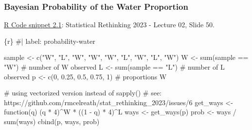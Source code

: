 \documentclass[
  letterpaper,
  DIV=11,
  numbers=noendperiod]{scrreprt}
\newenvironment{Shaded}{\begin{snugshade}}{\end{snugshade}}
\newcommand{\CommentTok}[1]{\textcolor[rgb]{0.37,0.37,0.37}{#1}}
\newcommand{\ControlFlowTok}[1]{\textcolor[rgb]{0.00,0.23,0.31}{#1}}
\newcommand{\DecValTok}[1]{\textcolor[rgb]{0.68,0.00,0.00}{#1}}
\newcommand{\FloatTok}[1]{\textcolor[rgb]{0.68,0.00,0.00}{#1}}
\newcommand{\FunctionTok}[1]{\textcolor[rgb]{0.28,0.35,0.67}{#1}}
\newcommand{\InformationTok}[1]{\textcolor[rgb]{0.37,0.37,0.37}{#1}}
\newcommand{\NormalTok}[1]{\textcolor[rgb]{0.00,0.23,0.31}{#1}}
\newcommand{\OtherTok}[1]{\textcolor[rgb]{0.00,0.23,0.31}{#1}}
\newcommand{\SpecialCharTok}[1]{\textcolor[rgb]{0.37,0.37,0.37}{#1}}
\newcommand{\StringTok}[1]{\textcolor[rgb]{0.13,0.47,0.30}{#1}}
\begin{document}
\hypertarget{bayesian-probability-of-the-water-proportion}{%
\subsubsection{Bayesian Probability of the Water
Proportion}\label{bayesian-probability-of-the-water-proportion}}

\href{https://speakerdeck.com/rmcelreath/statistical-rethinking-2023-lecture-02?slide=50}{R
Code snippet 2.1}: Statistical Rethinking 2023 - Lecture 02, Slide 50.

\begin{Shaded}
\begin{Highlighting}[]
\InformationTok{\textasciigrave{}\textasciigrave{}\textasciigrave{}\{r\}}
\CommentTok{\#| label: probability{-}water}

\NormalTok{sample }\OtherTok{\textless{}{-}} \FunctionTok{c}\NormalTok{(}\StringTok{"W"}\NormalTok{, }\StringTok{"L"}\NormalTok{, }\StringTok{"W"}\NormalTok{, }\StringTok{"W"}\NormalTok{, }\StringTok{"W"}\NormalTok{, }\StringTok{"L"}\NormalTok{, }\StringTok{"W"}\NormalTok{, }\StringTok{"L"}\NormalTok{, }\StringTok{"W"}\NormalTok{)}
\NormalTok{W }\OtherTok{\textless{}{-}} \FunctionTok{sum}\NormalTok{(sample }\SpecialCharTok{==} \StringTok{"W"}\NormalTok{) }\CommentTok{\# number of W observed}
\NormalTok{L }\OtherTok{\textless{}{-}} \FunctionTok{sum}\NormalTok{(sample }\SpecialCharTok{==} \StringTok{"L"}\NormalTok{) }\CommentTok{\# number of L observed}
\NormalTok{p }\OtherTok{\textless{}{-}} \FunctionTok{c}\NormalTok{(}\DecValTok{0}\NormalTok{, }\FloatTok{0.25}\NormalTok{, }\FloatTok{0.5}\NormalTok{, }\FloatTok{0.75}\NormalTok{, }\DecValTok{1}\NormalTok{) }\CommentTok{\# proportions W}

\CommentTok{\# using vectorized version instead of sapply()}
\CommentTok{\# see: https://github.com/rmcelreath/stat\_rethinking\_2023/issues/6}
\NormalTok{get\_ways }\OtherTok{\textless{}{-}} \ControlFlowTok{function}\NormalTok{(q) (q }\SpecialCharTok{*} \DecValTok{4}\NormalTok{)}\SpecialCharTok{\^{}}\NormalTok{W }\SpecialCharTok{*}\NormalTok{ ((}\DecValTok{1} \SpecialCharTok{{-}}\NormalTok{ q) }\SpecialCharTok{*} \DecValTok{4}\NormalTok{)}\SpecialCharTok{\^{}}\NormalTok{L}
\NormalTok{ways }\OtherTok{\textless{}{-}} \FunctionTok{get\_ways}\NormalTok{(p)}
\NormalTok{prob }\OtherTok{\textless{}{-}}\NormalTok{ ways }\SpecialCharTok{/} \FunctionTok{sum}\NormalTok{(ways)}
\FunctionTok{cbind}\NormalTok{(p, ways, prob)}
\InformationTok{\textasciigrave{}\textasciigrave{}\textasciigrave{}}
\end{Highlighting}
\end{Shaded}
\end{document}
